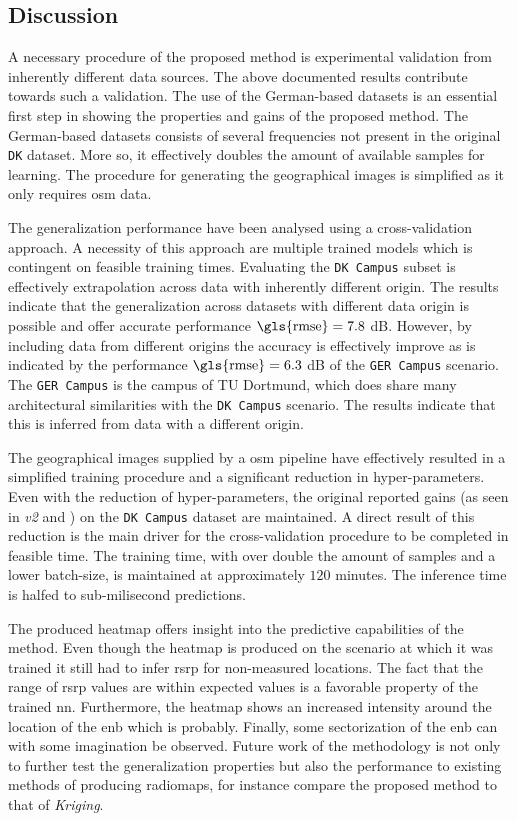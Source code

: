 \subsection{Discussion}

A necessary procedure of the proposed method is experimental validation from inherently different data sources. The above documented results contribute towards such a validation. The use of the German-based datasets is an essential first step in showing the properties and gains of the proposed method. The German-based datasets consists of several frequencies not present in the original \texttt{DK} dataset. More so, it effectively doubles the amount of available samples for learning. The procedure for generating the geographical images is simplified as it only requires \gls{osm} data. 

The generalization performance have been analysed using a cross-validation approach. A necessity of this approach are multiple trained models which is contingent on feasible training times. Evaluating the \texttt{DK Campus} subset is effectively extrapolation across data with inherently different origin. The results indicate that the generalization across datasets with different data origin is possible and offer accurate performance $\text{\gls{rmse}} = 7.8$ dB. However, by including data from different origins the accuracy is effectively improve as is indicated by the performance $\text{\gls{rmse}} = 6.3$ dB of the \texttt{GER Campus} scenario. The  \texttt{GER Campus} is the campus of TU Dortmund, which does share many architectural similarities with the \texttt{DK Campus} scenario. The results indicate that this is inferred from data with a different origin. 

The geographical images supplied by a \gls{osm} pipeline have effectively resulted in a simplified training procedure and a significant reduction in hyper-parameters. Even with the reduction of hyper-parameters, the original reported gains (as seen in \emph{v2} and \cite{Thrane020ModelAidedDeepLearning}) on the \texttt{DK Campus} dataset are maintained. A direct result of this reduction is the main driver for the cross-validation procedure to be completed in feasible time. The training time, with over double the amount of samples and a lower batch-size, is maintained at approximately $120$ minutes. The inference time is halfed to sub-milisecond predictions.

The produced heatmap offers insight into the predictive capabilities of the method. Even though the heatmap is produced on the scenario at which it was trained it still had to infer \gls{rsrp} for non-measured locations. The fact that the range of \gls{rsrp} values are within expected values is a favorable property of the trained \gls{nn}. Furthermore, the heatmap shows an increased intensity around the location of the \gls{enb} which is probably. Finally, some sectorization of the \gls{enb} can with some imagination be observed. Future work of the methodology is not only to further test the generalization properties but also the performance to existing methods of producing radiomaps, for instance compare the proposed method to that of \emph{Kriging}.

